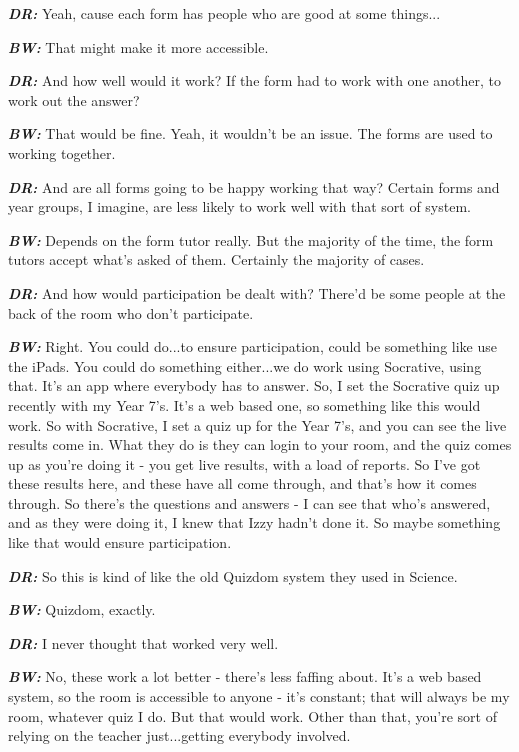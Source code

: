 \textit{\textbf{DR:}} Yeah, cause each form has people who are good at some things...

\textit{\textbf{BW:}} That might make it more accessible.

\textit{\textbf{DR:}} And how well would it work? If the form had to work with one another, to work out the answer?

\textit{\textbf{BW:}} That would be fine. Yeah, it wouldn't be an issue. The forms are used to working together.

\textit{\textbf{DR:}} And are all forms going to be happy working that way? Certain forms and year groups, I imagine, are less likely to work well with that sort of system.

\textit{\textbf{BW:}} Depends on the form tutor really. But the majority of the time, the form tutors accept what's asked of them. Certainly the majority of cases.

\textit{\textbf{DR:}} And how would participation be dealt with? There'd be some people at the back of the room who don't participate.

\textit{\textbf{BW:}} Right. You could do...to ensure participation, could be something like use the iPads. You could do something either...we do work using Socrative, using that. It's an app where everybody has to answer. So, I set the Socrative quiz up recently with my Year 7's. It's a web based one, so something like this would work. So with Socrative, I set a quiz up for the Year 7's, and you can see the live results come in. What they do is they can login to your room, and the quiz comes up as you're doing it - you get live results, with a load of reports. So I've got these results here, and these have all come through, and that's how it comes through. So there's the questions and answers - I can see that who's answered, and as they were doing it, I knew that Izzy hadn't done it. So maybe something like that would ensure participation.

\textit{\textbf{DR:}} So this is kind of like the old Quizdom system they used in Science.

\textit{\textbf{BW:}} Quizdom, exactly.

\textit{\textbf{DR:}} I never thought that worked very well.
 
\textit{\textbf{BW:}} No, these work a lot better - there's less faffing about. It's a web based system, so the room is accessible to anyone - it's constant; that will always be my room, whatever quiz I do. But that would work. Other than that, you're sort of relying on the teacher just...getting everybody involved.

